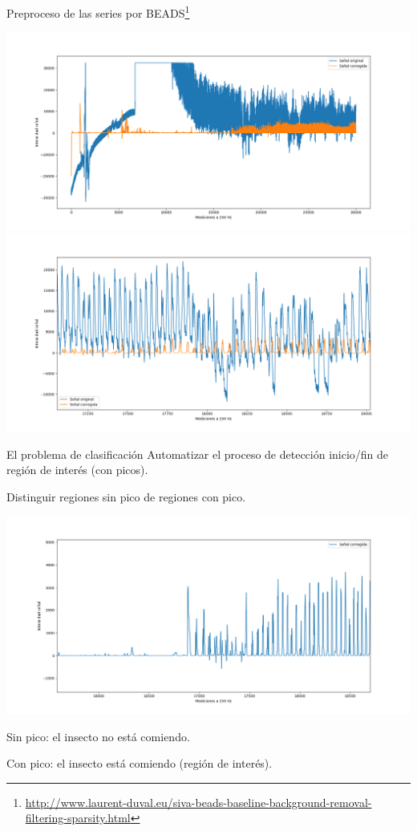 \documentclass[presentation,9pt]{beamer}
\begin{document}
\begin{frame}{Preproceso de las series por BEADS\footnote{\url{http://www.laurent-duval.eu/siva-beads-baseline-background-removal-filtering-sparsity.html}}}
	
	\includegraphics[width=.8\textwidth]{./senial.png}
	\includegraphics[width=.8\textwidth]{./senial2.png}

\end{frame}

\begin{frame}{El problema de clasificación}
	Automatizar el proceso de detección inicio/fin de región de interés (con picos).
	
	Distinguir regiones sin pico de regiones con pico.
	
	\includegraphics[width=\textwidth]{./zonaSinConPico.png}
	
	Sin pico: el insecto no está comiendo.

	Con pico: el insecto está comiendo (región de interés).

\end{frame}
\end{document}
